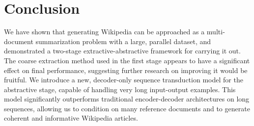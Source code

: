 \section{Conclusion}
We have shown that generating Wikipedia can be approached as a multi-document
summarization problem with a large, parallel dataset,
and demonstrated a two-stage extractive-abstractive framework for carrying it out.
The coarse extraction method used in the first
stage appears to have a significant effect on final performance, suggesting
further research on improving it would be fruitful. We introduce a new,
decoder-only sequence transduction model for the abstractive stage,
capable of handling very long input-output examples.
This model significantly outperforms traditional encoder-decoder architectures
on long sequences, allowing us to condition on many reference documents and
to generate coherent and informative Wikipedia articles.
